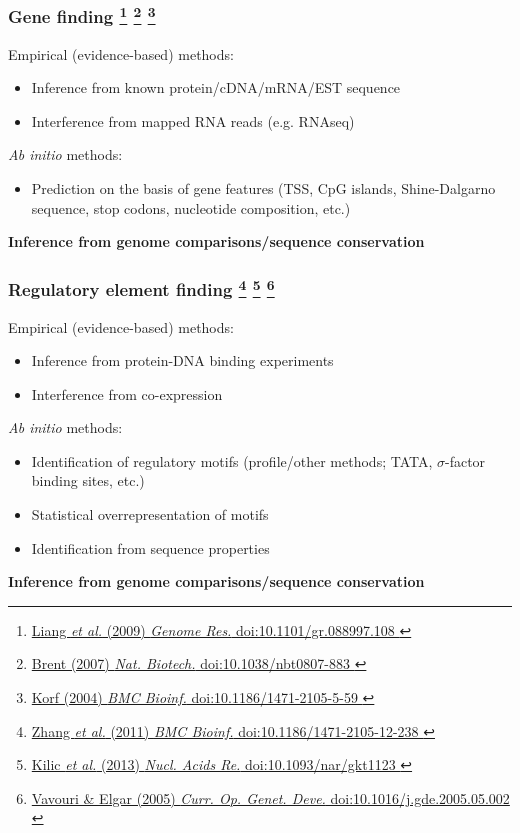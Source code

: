 
%
\begin{frame}
  \frametitle{Gene finding
  \footnote{\tiny{\href{http://dx.doi.org/10.1101/gr.088997.108
}{Liang \textit{et al.} (2009) \textit{Genome Res.} doi:10.1101/gr.088997.108
}}}
    \footnote{\tiny{\href{http://dx.doi.org/10.1038/nbt0807-883
}{Brent (2007) \textit{Nat. Biotech.} doi:10.1038/nbt0807-883
}}}
    \footnote{\tiny{\href{http://dx.doi.org/10.1186/1471-2105-5-59
}{Korf (2004) \textit{BMC Bioinf.} doi:10.1186/1471-2105-5-59
}}}
    }
  \textcolor{hutton_green}{Empirical (evidence-based) methods:}
  \begin{itemize}
    \item Inference from known protein/cDNA/mRNA/EST sequence
    \item Interference from mapped RNA reads (e.g. RNAseq)
  \end{itemize}
  \textcolor{hutton_blue}{\textit{Ab initio} methods:}
  \begin{itemize}
    \item Prediction on the basis of gene features (TSS, CpG islands, Shine-Dalgarno sequence, stop codons, nucleotide composition, etc.)
  \end{itemize}
  \textcolor{hutton_purple}{\textbf{Inference from genome comparisons/sequence conservation}}
\end{frame}

%
\begin{frame}
  \frametitle{Regulatory element finding
  \footnote{\tiny{\href{http://dx.doi.org/10.1186/1471-2105-12-238
}{Zhang \textit{et al.} (2011) \textit{BMC Bioinf.} doi:10.1186/1471-2105-12-238
}}}
    \footnote{\tiny{\href{http://dx.doi.org/10.1093/nar/gkt1123
}{Kilic \textit{et al.} (2013) \textit{Nucl. Acids Re.} doi:10.1093/nar/gkt1123
}}}
    \footnote{\tiny{\href{http://dx.doi.org/10.1016/j.gde.2005.05.002
}{Vavouri \& Elgar (2005) \textit{Curr. Op. Genet. Deve.} doi:10.1016/j.gde.2005.05.002
}}}
    }
  \textcolor{hutton_green}{Empirical (evidence-based) methods:}
  \begin{itemize}
    \item Inference from protein-DNA binding experiments
    \item Interference from co-expression
  \end{itemize}
  \textcolor{hutton_blue}{\textit{Ab initio} methods:}
  \begin{itemize}
    \item Identification of regulatory motifs (profile/other methods; TATA, $\sigma$-factor binding sites, etc.)
    \item Statistical overrepresentation of motifs
    \item Identification from sequence properties
  \end{itemize}
  \textcolor{hutton_purple}{\textbf{Inference from genome comparisons/sequence conservation}}
\end{frame}

